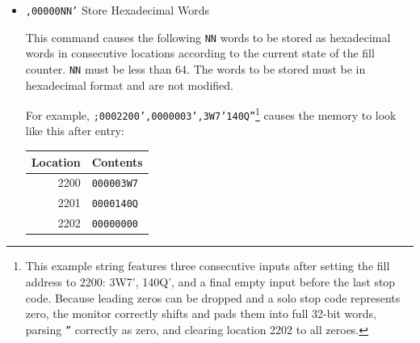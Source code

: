 \begin{itemize}
This keyword enables the programmer to have the computer execute an instruction directly. The instruction $\emptyset$\texttt{TTSS} contained within the keyword (where $\emptyset$ represents a valid opcode symbol and \texttt{TTSS} is any real address in decimal track/sector notation) is executed following the entry of a hexadecimal word and/or a stop code. The second hexadecimal word is loaded into the accumulator.

The address portion of the command entered is \emph{not} modified by the address modifier; nor is any hexadecimal word entered as a secondary word. All keywords and additional hexadecimal words must be followed by a stop code. Leading zeros in the hexadecimal word may be omitted.

The Direct Execute command allows you to immediately execute a command without writing it to memory.

For example, if we wished to execute an \texttt{H} command to store the hexadecimal word \texttt{73W08} into location 1637, the command sequence \texttt{+00H1637'73W08'} causes the value \texttt{00073W08} to be stored in location 1637. As a second example, the command \texttt{+00U1735''} (note the two stop codes to indicate ``no second word'') causes a jump to 1735.

The keyword for the direct command does not alter the fill counter; any subsequent fill continues from the last fill location.

\item \texttt{,00000NN'} Store Hexadecimal Words

This command causes the following \texttt{NN} words to be stored as hexadecimal words in consecutive locations according to the current state of the fill counter. \texttt{NN} must be less than 64. The words to be stored must be in hexadecimal format and are not modified.

For example, \texttt{;0002200',0000003',3W7'140Q''}\footnote{This example string features three consecutive inputs after setting the fill address to 2200: 3W7', 140Q', and a final empty input before the last stop code. Because leading zeros can be dropped and a solo stop code represents zero, the monitor correctly shifts and pads them into full 32-bit words, parsing \texttt{''} correctly as zero, and clearing location 2202 to all zeroes.} causes the memory to look like this after entry:

\begin{center}
\begin{tabular}{rl}
    \toprule
    \textbf{Location} & \textbf{Contents} \\
    \midrule
    2200          & \texttt{000003W7} \\
    2201          & \texttt{0000140Q} \\
    2202          & \texttt{00000000} \\
    \bottomrule
\end{tabular}
\end{center}


\end{itemize}
